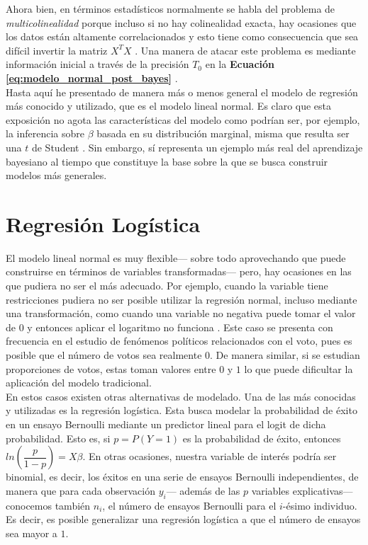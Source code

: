 Ahora bien, en términos estadísticos normalmente se habla del problema de \textit{multicolinealidad} porque incluso si no hay colinealidad exacta, hay ocasiones que los datos están altamente correlacionados y esto tiene como consecuencia que sea difícil invertir la matriz $X^TX$ \parencite[58]{Usi14}. Una manera de atacar este problema es mediante información inicial a través de la precisión $T_0$ en la \textbf{Ecuación \ref{eq:modelo_normal_post_bayes}} \parencite[112]{Congdon06}.\\ 

Hasta aquí he presentado de manera más o menos general el modelo de regresión más conocido y utilizado, que es el modelo lineal normal. Es claro que esta exposición no agota las características del modelo como podrían ser, por ejemplo, la inferencia sobre $\beta$ basada en su distribución marginal, misma que resulta ser una $t$ de Student \parencite[16]{GP98}. Sin embargo, sí representa un ejemplo más real del aprendizaje bayesiano al tiempo que constituye la base sobre la que se busca construir modelos más generales. 


\section{Regresión Logística}

El modelo lineal normal es muy flexible--- sobre todo aprovechando que puede construirse en términos de variables transformadas--- pero, hay ocasiones en las que pudiera no ser el más adecuado. Por ejemplo, cuando la variable tiene restricciones pudiera no ser posible utilizar la regresión normal, incluso mediante una transformación, como cuando una variable no negativa puede tomar el valor de $0$ y entonces aplicar el logaritmo no funciona \parencite[405]{Gelman13}. Este caso se presenta con frecuencia en el estudio de fenómenos políticos relacionados con el voto, pues es posible que el número de votos sea realmente $0$. De manera similar, si se estudian proporciones de votos, estas toman valores entre $0$ y $1$ lo que puede dificultar la aplicación del modelo tradicional.\\ 


En estos casos existen otras alternativas de modelado. Una de las más conocidas y utilizadas es la regresión logística. Esta busca modelar la probabilidad de éxito en un ensayo Bernoulli mediante un predictor lineal para el logit de dicha probabilidad. Esto es, si $p = P(Y=1)$ es la probabilidad de éxito, entonces $ln\left(\dfrac{p}{1-p}\right)=X\beta$. En otras ocasiones, nuestra variable de interés podría ser binomial, es decir, los éxitos en una serie de ensayos Bernoulli independientes, de manera que para cada observación $y_i$--- además de las $p$ variables explicativas--- conocemos también $n_i$, el número de ensayos Bernoulli para el $i$-ésimo individuo. Es decir, es posible generalizar una regresión logística a que el número de ensayos sea mayor a $1$.\\ 

